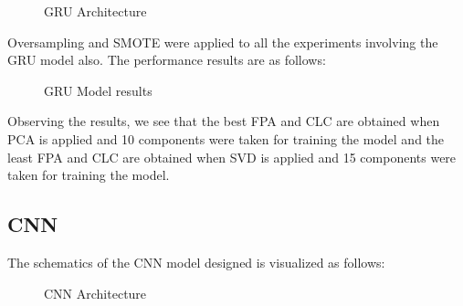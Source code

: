 \begin{figure}
%
  \caption{GRU Architecture}
  \label{fig:key}
\end{figure}

Oversampling and SMOTE were applied to all the experiments involving the GRU model also. The performance results are as follows:
 
 \begin{figure}
%
  \caption{GRU Model results}
  \label{fig:key}
\end{figure}
 
Observing the results, we see that the best FPA and CLC are obtained when PCA is applied and 10 components were taken for training the model and the least FPA and CLC are obtained when SVD is applied and 15 components were taken for training the model.

\subsection{CNN}
The schematics of the CNN model designed is visualized as follows:

\begin{figure}
%
  \caption{CNN Architecture}
  \label{fig:key}
\end{figure}


